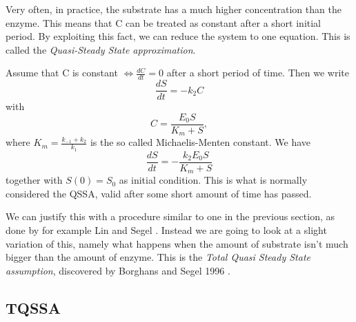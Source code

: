 \documentclass[12pt]{article}
\begin{document}
Very often, in practice, the substrate has a much higher concentration
than the enzyme. This means that C can be treated as constant after a
short initial period. By exploiting this fact, we can reduce the
system to one equation. This is called the \textit{Quasi-Steady State
  approximation}.

Assume that C is constant $\iff \frac{dC}{dt} = 0$ after a short
period of time. Then we write
\begin{equation}
\frac{dS}{dt} = -k_2 C
\end{equation}
with
\begin{equation}
C = \frac{E_0 S}{K_m +S},
\end{equation}
where $K_m = \frac{k_{-1} + k_2}{k_1}$ is the so called {Michaelis-Menten
constant}. We have
\begin{equation}
\frac{dS}{dt} = - \frac{k_2 E_0 S}{K_m + S}
\end{equation}
together with $S(0) = S_0$ as initial condition. This is what is
normally considered the QSSA, valid after some short amount of time
has passed.

We can justify this with a procedure similar to one in the previous
section, as done by for example Lin and Segel
\cite{lin1974mathematics}. Instead we are going to look at a slight
variation of this, namely what happens when the amount of substrate
isn't much bigger than the amount of enzyme. This is the
\textit{Total Quasi Steady State assumption}, discovered by Borghans
and Segel 1996 \cite{borghans1996extending}.

\subsection{TQSSA}
\end{document}
